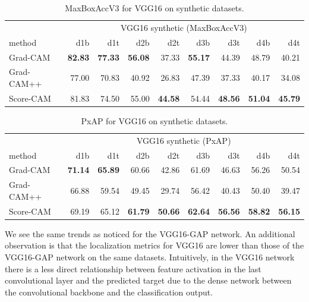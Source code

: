 \begin{table}[ht]
\centering
\begin{tabular}{lrrrrrrrr}
\toprule
 & \multicolumn{8}{c}{VGG16 synthetic (MaxBoxAccV3)} \\
method & d1b & d1t & d2b & d2t & d3b & d3t & d4b & d4t \\
\cmidrule(lr){1-1} \cmidrule(lr){2-9} 
Grad-CAM & \bfseries 82.83 & \bfseries 77.33 & \bfseries 56.08 & 37.33 & \bfseries 55.17 & 44.39 & 48.79 & 40.21 \\
Grad-CAM++ & 77.00 & 70.83 & 40.92 & 26.83 & 47.39 & 37.33 & 40.17 & 34.08 \\
Score-CAM & 81.83 & 74.50 & 55.00 & \bfseries 44.58 & 54.44 & \bfseries 48.56 & \bfseries 51.04 & \bfseries 45.79 \\
\bottomrule
\end{tabular}
\caption[MaxBoxAccV3 for VGG16 on synthetic datasets]{MaxBoxAccV3 for VGG16 on synthetic datasets.}
\label{tab:maxboxaccv3_vgg16_base_synthetic}
\end{table}
\begin{table}[h]
\centering
\begin{tabular}{lrrrrrrrr}
\toprule
 & \multicolumn{8}{c}{VGG16 synthetic (PxAP)} \\
method & d1b & d1t & d2b & d2t & d3b & d3t & d4b & d4t \\
\cmidrule(lr){1-1} \cmidrule(lr){2-9} 
Grad-CAM & \bfseries 71.14 & \bfseries 65.89 & 60.66 & 42.86 & 61.69 & 46.63 & 56.26 & 50.54 \\
Grad-CAM++ & 66.88 & 59.54 & 49.45 & 29.74 & 56.42 & 40.43 & 50.40 & 39.47 \\
Score-CAM & 69.19 & 65.12 & \bfseries 61.79 & \bfseries 50.66 & \bfseries 62.64 & \bfseries 56.56 & \bfseries 58.82 & \bfseries 56.15 \\
\bottomrule
\end{tabular}
\caption[PxAP for VGG16 on synthetic datasets]{PxAP for VGG16 on synthetic datasets.}
\label{tab:pxap_vgg16_base_synthetic}
\end{table}

We see the same trends as noticed for the VGG16-GAP network. An additional observation is that the localization metrics for VGG16 are lower than those of the VGG16-GAP network on the same datasets. Intuitively, in the VGG16 network there is a less direct relationship between feature activation in the last convolutional layer and the predicted target due to the dense network between the convolutional backbone and the classification output.

